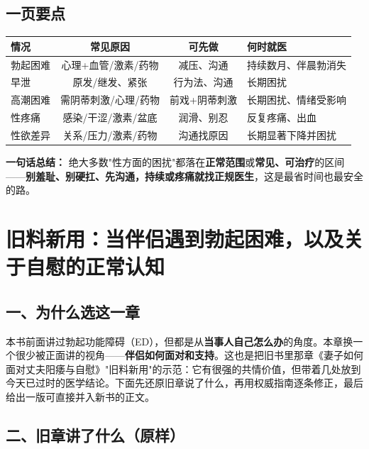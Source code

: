 \documentclass[12pt,UTF8,openany]{ctexbook}
\begin{document}
\section{一页要点}

\begin{tabularx}{\textwidth}{lCCX}
\toprule
情况 & 常见原因 & 可先做 & 何时就医 \\
\midrule
勃起困难 & 心理+血管/激素/药物 & 减压、沟通 & 持续数月、伴晨勃消失 \\
早泄 & 原发/继发、紧张 & 行为法、沟通 & 长期困扰 \\
高潮困难 & 需阴蒂刺激/心理/药物 & 前戏+阴蒂刺激 & 长期困扰、情绪受影响 \\
性疼痛 & 感染/干涩/激素/盆底 & 润滑、别忍 & 反复疼痛、出血 \\
性欲差异 & 关系/压力/激素/药物 & 沟通找原因 & 长期显著下降并困扰 \\
\bottomrule
\end{tabularx}

\vspace{1em}
\noindent\textbf{一句话总结：} 绝大多数"性方面的困扰"都落在\textbf{正常范围}或\textbf{常见、可治疗}的区间——\textbf{别羞耻、别硬扛、先沟通，持续或疼痛就找正规医生}，这是最省时间也最安全的路。

\chapter{旧料新用：当伴侣遇到勃起困难，以及关于自慰的正常认知}
\label{chap:partner-ed}

\section{一、为什么选这一章}

本书前面讲过勃起功能障碍（ED），但都是从\textbf{当事人自己怎么办}的角度。本章换一个很少被正面讲的视角——\textbf{伴侣如何面对和支持}。这也是把旧书里那章《妻子如何面对丈夫阳痿与自慰》"旧料新用"的示范：它有很强的共情价值，但带着几处放到今天已过时的医学结论。下面先还原旧章说了什么，再用权威指南逐条修正，最后给出一版可直接并入新书的正文。

\section{二、旧章讲了什么（原样）}
\end{document}
